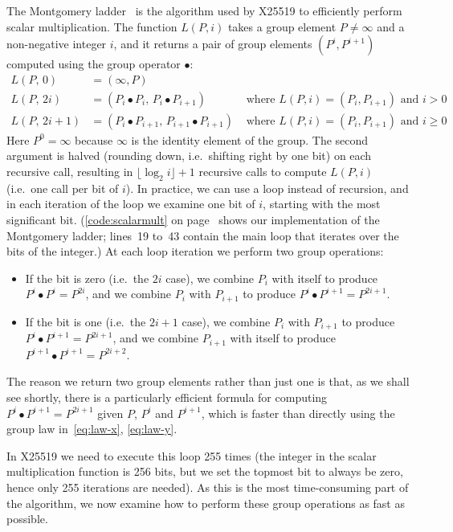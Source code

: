 \documentclass[manuscript]{acmart}
\begin{document}
The Montgomery ladder~\cite{Bernstein:2017fm,Costello:2018,Montgomery:1987fz} is the algorithm used by X25519 to efficiently perform scalar multiplication.
The function $L(P, i)$ takes a group element $P \ne \infty$ and a non-negative integer $i$, and it returns a pair of group elements $(P^i, P^{i+1})$ computed using the group operator $\bullet$:
\begin{align}
L(P,\, 0) &= (\infty, P) \label{eq:ladder}\\
L(P,\, 2i) &= (P_i \bullet P_i,\, P_i \bullet P_{i+1}) & \text{ where } L(P, i) = (P_i, P_{i+1}) \text{ and } i>0 \nonumber\\
L(P,\, 2i+1) &= (P_i \bullet P_{i+1},\, P_{i+1} \bullet P_{i+1}) & \text{ where } L(P, i) = (P_i, P_{i+1}) \text{ and } i \ge 0 \nonumber
\end{align}
Here $P^0 = \infty$ because $\infty$ is the identity element of the group.
The second argument is halved (rounding down, i.e.\ shifting right by one bit) on each recursive call, resulting in $\lfloor\log_2 i\rfloor + 1$ recursive calls to compute $L(P, i)$ (i.e.\ one call per bit of $i$).
In practice, we can use a loop instead of recursion, and in each iteration of the loop we examine one bit of $i$, starting with the most significant bit.
(\autoref{code:scalarmult} on page~\pageref{code:scalarmult} shows our implementation of the Montgomery ladder; lines~19 to~43 contain the main loop that iterates over the bits of the integer.)
At each loop iteration we perform two group operations:
\begin{itemize}
\item If the bit is zero (i.e.\ the $2i$ case), we combine $P_i$ with itself to produce $P^i \bullet P^i = P^{2i}$, and we combine $P_i$ with $P_{i+1}$ to produce $P^i \bullet P^{i+1} = P^{2i+1}$.
\item If the bit is one (i.e.\ the $2i+1$ case), we combine $P_i$ with $P_{i+1}$ to produce $P^i \bullet P^{i+1} = P^{2i+1}$, and we combine $P_{i+1}$ with itself to produce $P^{i+1} \bullet P^{i+1} = P^{2i+2}$.
\end{itemize}

The reason we return two group elements rather than just one is that, as we shall see shortly, there is a particularly efficient formula for computing $P^i \bullet P^{i+1} = P^{2i+1}$ given $P$, $P^i$ and $P^{i+1}$, which is faster than directly using the group law in~\eqref{eq:law-x}, \eqref{eq:law-y}.

In X25519 we need to execute this loop 255 times (the integer in the scalar multiplication function is 256 bits, but we set the topmost bit to always be zero, hence only 255 iterations are needed).
As this is the most time-consuming part of the algorithm, we now examine how to perform these group operations as fast as possible.
\end{document}
